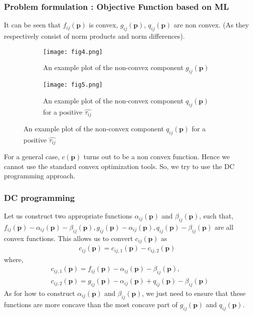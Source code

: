 \documentclass{beamer}
\begin{document}
\begin{frame}
\frametitle{Problem formulation : Objective Function based on ML}
It can be seen that $f_{ij}(\bm{p})$ is convex, $g_{ij}(\bm{p})$, $q_{ij}(\bm{p})$ are non convex. (As they respectively consist of norm products and norm differences). 
\begin{figure}
    \centering
    \begin{subfigure}[b!]{0.45\linewidth}
    \centering
    \texttt{[image: fig4.png]}
    \caption{An example plot of the non-convex component $g_{ij}(\bm{p})$} 
    \label{fig:img4}
    \end{subfigure}
    \begin{subfigure}[b!]{0.45\linewidth}
    \centering
    \texttt{[image: fig5.png]}
    \caption{An example plot of the non-convex component $q_{ij}(\bm{p})$ for a positive $\widehat{\tau_{ij}}$}
    \label{fig:img5}
    \end{subfigure}
\end{figure}
For a general case, $c(\bm{p})$ turns out to be a non convex function. Hence we cannot use the standard convex optimization tools. So, we try to use the DC programming approach.
\end{frame}

\begin{frame}
\frametitle{DC programming}
Let us construct two appropriate functions $\alpha_{ij}(\bm{p})$ and $\beta_{ij}(\bm{p})$, such that, $f_{ij}(\bm{p})-\alpha_{ij}(\bm{p})-\beta_{ij}(\bm{p}), g_{ij}(\bm{p})-\alpha_{ij}(\bm{p}), q_{ij}(\bm{p})-\beta_{ij}(\bm{p})$ are all convex functions. This allows us to convert $c_{ij}(\bm{p})$ as
\begin{align}
\label{eq:dc}
    c_{ij}(\bm{p})=c_{ij,1}(\bm{p})-c_{ij,2}(\bm{p})
\end{align}
where, 
\begin{align}
    &c_{ij,1}(\bm{p})=f_{ij}(\bm{p})-\alpha_{ij}(\bm{p})-\beta_{ij}(\bm{p}),\\
    &c_{ij,2}(\bm{p})=g_{ij}(\bm{p})-\alpha_{ij}(\bm{p})+q_{ij}(\bm{p})-\beta_{ij}(\bm{p})
\end{align}
As for how to construct $\alpha_{ij}(\bm{p})$ and $\beta_{ij}(\bm{p})$, we just need to ensure that these functions are more concave than the most concave part of $g_{ij}(\bm{p})$ and $q_{ij}(\bm{p})$. 
\end{frame}
\end{document}
